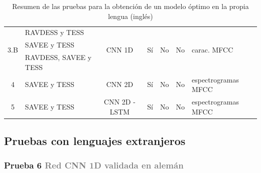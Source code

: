 \documentclass[11pt,a4paper,spanish]{book}
\begin{document}
\begin{table}[H]
\begin{center}
\begin{tabular}{| c | p{3.5cm} | c | c c c | p{3.5cm} |}
			\multirow{3}{*}{3.B} & RAVDESS y TESS & \multirow{3}{*}{CNN 1D} & \multirow{3}{*}{ Sí}&\multirow{3}{*}{ No} & \multirow{3}{*}{ No} & \multirow{3}{*}{carac. MFCC}	\\
			& SAVEE y TESS &  & &&  & 	\\
			& RAVDESS, SAVEE y TESS &  & &&  & 	\\\hline
			
			4 & SAVEE y TESS & CNN 2D &Sí &No &No & espectrogramas MFCC\\ \hline
			5 & SAVEE y TESS & CNN 2D - LSTM &Sí &No &No & espectrogramas MFCC\\ \hline
			
		\end{tabular}
		
		\caption{Resumen de las pruebas para la obtención de un modelo óptimo en la propia lengua (inglés)}
		\label{tab:resumenTests1}
		\end{center}
	\end{table}


	\subsection{Pruebas con lenguajes extranjeros}
	
	\subsubsection{\large Prueba 6 {\normalsize \textcolor{Gray}{Red CNN 1D validada en alemán}}}
	
\end{document}
